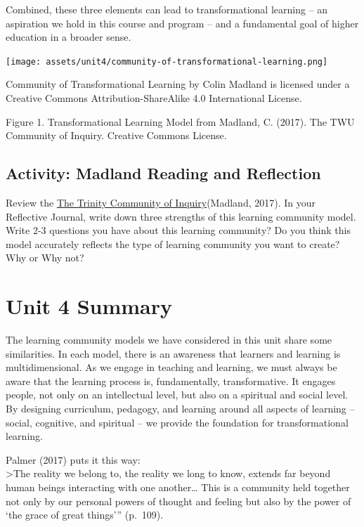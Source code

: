 \documentclass[
]{book}
\begin{document}
Combined, these three elements can lead to transformational learning -- an aspiration we hold in this course and program -- and a fundamental goal of higher education in a broader sense.

\texttt{[image: assets/unit4/community-of-transformational-learning.png]}

{Community of Transformational Learning} by Colin Madland is licensed under a Creative Commons Attribution-ShareAlike 4.0 International License.

Figure 1. Transformational Learning Model from Madland, C. (2017). The TWU Community of Inquiry. Creative Commons
License.

\hypertarget{activity-madland-reading-and-reflection}{%
\subsection{Activity: Madland Reading and Reflection}\label{activity-madland-reading-and-reflection}}

\begin{reflect}
Review the \href{assets/unit4/Madland-transformational-learning.pdf}{The
Trinity Community of Inquiry}(Madland, 2017). In your Reflective
Journal, write down three strengths of this learning community model.
Write 2-3 questions you have about this learning community? Do you think
this model accurately reflects the type of learning community you want
to create? Why or Why not?
\end{reflect}

\hypertarget{unit-4-summary}{%
\section*{Unit 4 Summary}\label{unit-4-summary}}

The learning community models we have considered in this unit share some similarities. In each model, there is an awareness that learners and learning is multidimensional. As we engage in teaching and learning, we must always be aware that the learning process is, fundamentally, transformative. It engages people, not only on an intellectual level, but also on a spiritual and social level. By designing curriculum, pedagogy, and learning around all aspects of learning -- social, cognitive, and spiritual -- we provide the foundation for transformational learning.

Palmer (2017) puts it this way:\\
\textgreater The reality we belong to, the reality we long to know, extends far beyond human beings interacting with one another\ldots{} This is a community held together not only by our personal powers of thought and feeling but also by the power of `the grace of great things''' (p.~109).
\end{document}
